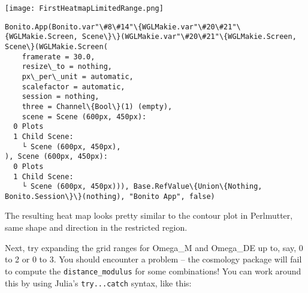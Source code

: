 \documentclass[11pt]{article}
\begin{document}
    \begin{center}
      \texttt{[image: FirstHeatmapLimitedRange.png]}
    \end{center}

    
    \begin{Verbatim}[commandchars=\\\{\}]
Bonito.App(Bonito.var"\#8\#14"\{WGLMakie.var"\#20\#21"\{WGLMakie.Screen, Scene\}\}(WGLMakie.var"\#20\#21"\{WGLMakie.Screen, Scene\}(WGLMakie.Screen(
    framerate = 30.0,
    resize\_to = nothing,
    px\_per\_unit = automatic,
    scalefactor = automatic,
    session = nothing,
    three = Channel\{Bool\}(1) (empty),
    scene = Scene (600px, 450px):
  0 Plots
  1 Child Scene:
    └ Scene (600px, 450px),
), Scene (600px, 450px):
  0 Plots
  1 Child Scene:
    └ Scene (600px, 450px))), Base.RefValue\{Union\{Nothing, Bonito.Session\}\}(nothing), "Bonito App", false)
    \end{Verbatim}

    
    The resulting heat map looks pretty similar to the contour plot in
Perlmutter, same shape and direction in the restricted region.

    

    Next, try expanding the grid ranges for Omega\_M and Omega\_DE up to,
say, 0 to 2 or 0 to 3. You should encounter a problem -- the cosmology
package will fail to compute the \texttt{distance\_modulus} for some
combinations! You can work around this by using Julia's
\texttt{try...catch} syntax, like this:
\end{document}
